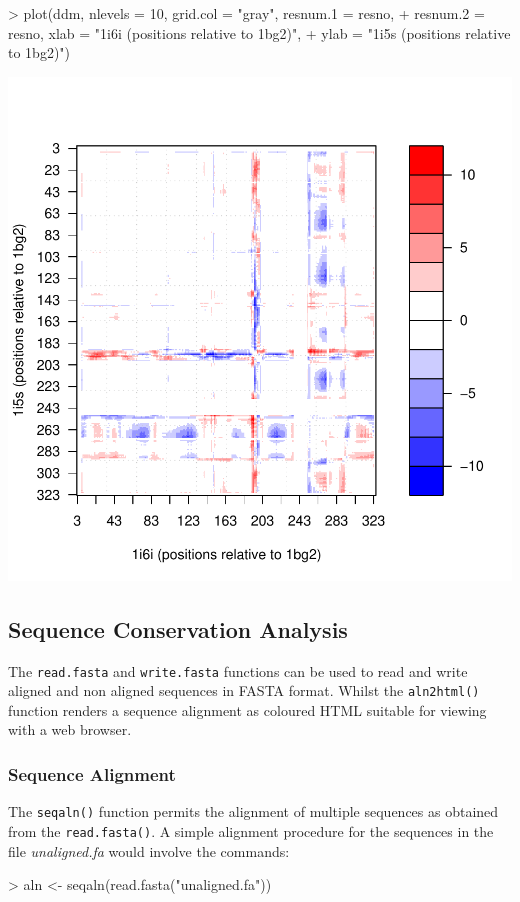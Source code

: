 \documentclass[a4paper]{article}
\begin{document}
\begin{center}
\begin{Schunk}
\begin{Sinput}
> plot(ddm, nlevels = 10, grid.col = "gray", resnum.1 = resno, 
+     resnum.2 = resno, xlab = "1i6i (positions relative to 1bg2)", 
+     ylab = "1i5s (positions relative to 1bg2)")
\end{Sinput}
\end{Schunk}
\includegraphics{figs/fig-031}
 
\end{center}















\subsection{Sequence Conservation Analysis}
The \texttt{read.fasta} and  \texttt{write.fasta} functions can be used to read and write aligned and non aligned sequences in FASTA format.  Whilst the \texttt{aln2html()} function renders a sequence alignment as coloured HTML suitable for viewing with a web browser.

\subsubsection{Sequence Alignment}
The \texttt{seqaln()} function permits the alignment of multiple sequences as obtained from the \texttt{read.fasta()}.  A simple alignment procedure for the sequences in the file \emph{unaligned.fa} would involve the commands:
\begin{Schunk}
\begin{Sinput}
> aln <- seqaln(read.fasta("unaligned.fa"))
\end{Sinput}
\end{Schunk}
\end{document}

